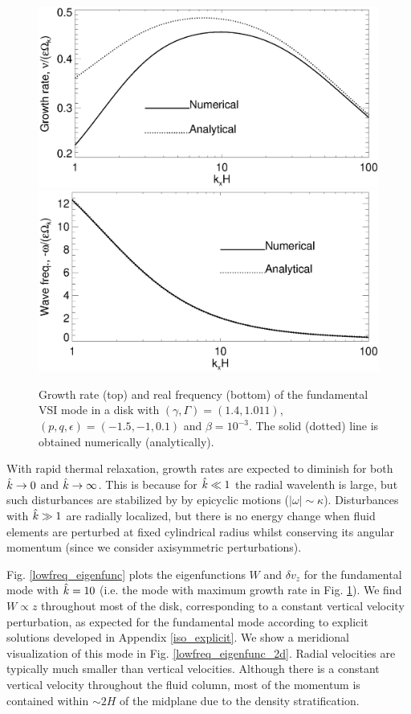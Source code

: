 \begin{figure}
  \includegraphics[width=\linewidth,clip=true,trim=0cm 1.75cm 0cm
  0cm]{figures/compare_eigen_imag_iso} 
  \includegraphics[width=\linewidth,clip=true,trim=0cm 0cm 0cm
  1cm]{figures/compare_eigen_real_iso}
  \caption{Growth rate (top) and real frequency (bottom) of the
    fundamental VSI mode in a disk with $(\gamma,
    \Gamma)=(1.4,1.011)$, $(p,q,\epsilon)=(-1.5,-1,0.1)$ and
    $\beta=10^{-3}$. The solid (dotted) line is obtained numerically
    (analytically).  
    \label{iso_eigen_kx} 
  }
\end{figure}

With rapid thermal relaxation, growth rates are expected to diminish for both $\hat{k}\to 0$
and $\hat{k}\to \infty$. This is because for $\hat{k}\ll 1$ the radial
wavelenth is large, but such disturbances are 
stabilized by by epicyclic motions ($|\omega|\sim
\kappa$). Disturbances with $\hat{k}\gg 1$ are radially localized, but  
there is no energy change when fluid elements are perturbed at fixed
cylindrical radius whilst conserving its angular momentum (since we
consider axisymmetric perturbations).  
 
Fig. \ref{lowfreq_eigenfunc} plots the eigenfunctions $W$ and $\delta 
v_z$ for the fundamental mode with $\hat{k}=10$ (i.e. the mode with
maximum growth rate in Fig. \ref{iso_eigen_kx}). We find $W\propto z$
throughout most of the disk, corresponding to a constant vertical
velocity perturbation, as expected for the fundamental mode according
to explicit solutions developed in Appendix \ref{iso_explicit}. We
show a meridional visualization of this mode in
Fig. \ref{lowfreq_eigenfunc_2d}. Radial velocities are typically much
smaller than vertical velocities. Although there is a constant vertical
velocity throughout the fluid column, most of the momentum is
contained within $\sim 2H$ of the midplane due to the density
stratification. 

